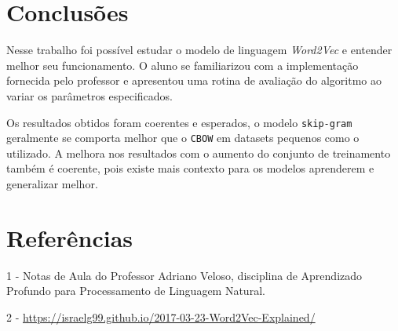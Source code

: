 \documentclass[11pt]{scrartcl} %
\begin{document}
\section{Conclusões}

Nesse trabalho foi possível estudar o modelo de linguagem \textit{Word2Vec} e entender melhor seu funcionamento. O aluno se familiarizou com a implementação fornecida pelo professor e apresentou uma rotina de avaliação do algoritmo ao variar os parâmetros especificados.

Os resultados obtidos foram coerentes e esperados, o modelo \texttt{skip-gram} geralmente se comporta melhor que o \texttt{CBOW} em datasets pequenos como o utilizado. A melhora nos resultados com o aumento do conjunto de treinamento também é coerente, pois existe mais contexto para os modelos aprenderem e generalizar melhor.


\section{Referências}

1 - Notas de Aula do Professor Adriano Veloso, disciplina de Aprendizado Profundo para Processamento de Linguagem Natural.

2 - \hyperlink{https://israelg99.github.io/2017-03-23-Word2Vec-Explained/}{https://israelg99.github.io/2017-03-23-Word2Vec-Explained/}
\end{document}
